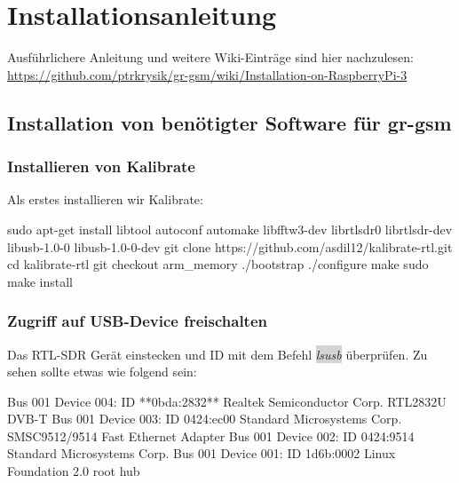 
\chapter{Installationsanleitung}\label{Install}

Ausführlichere Anleitung und weitere Wiki-Einträge sind hier nachzulesen:\\
\url{https://github.com/ptrkrysik/gr-gsm/wiki/Installation-on-RaspberryPi-3}


\section{Installation von benötigter Software für gr-gsm}

\subsection{Installieren von Kalibrate}

%
%

Als erstes installieren wir Kalibrate:

\begin{code}[	numbers=left,stepnumber=1]
sudo apt-get install libtool autoconf automake libfftw3-dev librtlsdr0 librtlsdr-dev libusb-1.0-0 libusb-1.0-0-dev
git clone https://github.com/asdil12/kalibrate-rtl.git
cd kalibrate-rtl
git checkout arm_memory
./bootstrap
./configure
make
sudo make install 
\end{code}

\subsection{Zugriff auf USB-Device freischalten}

Das RTL-SDR Gerät einstecken und ID mit dem Befehl \colorbox{lightgray}{\emph{lsusb}} überprüfen. Zu sehen sollte etwas wie folgend sein:

\begin{code}
Bus 001 Device 004: ID **0bda:2832** Realtek Semiconductor Corp. RTL2832U DVB-T
Bus 001 Device 003: ID 0424:ec00 Standard Microsystems Corp. SMSC9512/9514 Fast Ethernet Adapter
Bus 001 Device 002: ID 0424:9514 Standard Microsystems Corp.
Bus 001 Device 001: ID 1d6b:0002 Linux Foundation 2.0 root hub
\end{code}


